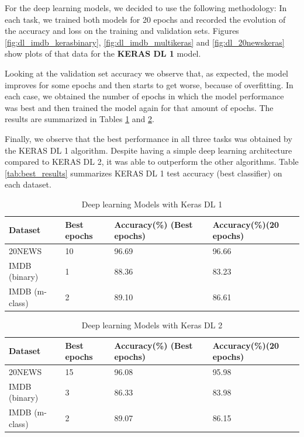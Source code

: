 \documentclass[conference]{IEEEtran}
\begin{document}
For the deep learning models, we decided to use the following methodology: In each task, we trained both models for 20 epochs and recorded the evolution of the accuracy and loss on the training and validation sets. Figures \ref{fig:dl_imdb_kerasbinary}, \ref{fig:dl_imdb_multikeras} and \ref{fig:dl_20newskeras} show plots of that data for the \textbf{KERAS DL 1} model.

Looking at the validation set accuracy we observe that, as expected, the model improves for some epochs and then starts to get worse, because of overfitting. In each case, we obtained the number of epochs in which the model performance was best and then trained the model again for that amount of epochs. The results are summarized in Tables \ref{tab:deeplearningDL1} and \ref{tab:deeplearningDL2}.

Finally, we observe that the best performance in all three tasks was obtained by the KERAS DL 1 algorithm. Despite having a simple deep learning architecture compared to KERAS DL 2, it was able to outperform the other algorithms. Table \ref{tab:best_results} summarizes KERAS DL 1 test accuracy (best classifier) on each dataset.

\begin{table}[H]
  \caption{Deep learning Models with Keras DL 1}
  \label{tab:deeplearningDL1}
  \begin{tabular}{|p{2cm}|p{1cm}|p{2cm}|p{2cm}|}

\hline
 Dataset& Best epochs &
 Accuracy(\%) (Best epochs) & Accuracy(\%)(20 epochs) \\
 \hline
  20NEWS             & 10                    & 96.69                          & 96.66               
 \\
 \hline 
IMDB (binary)      & 1                     & 88.36                          & 83.23                        
\\
\hline 
IMDB (m-class) & 2                     & 89.10                          & 86.61   \\

\hline
    
  \end{tabular}
\end{table}

\begin{table}[H]
  \caption{Deep learning Models with Keras DL 2}
  \label{tab:deeplearningDL2}
  \begin{tabular}{|p{2cm}|p{1cm}|p{2cm}|p{2cm}|}

\hline
 Dataset& Best epochs &
 Accuracy(\%) (Best epochs) & Accuracy(\%)(20 epochs) \\
 \hline
  20NEWS             & 15                    & 96.08                           & 95.98               
 \\
 \hline 
IMDB (binary)      & 3                     & 86.33                          & 83.98                        
\\
\hline 
IMDB (m-class) & 2                     &  89.07                        & 86.15    \\

\hline
    
  \end{tabular}
\end{table}
\end{document}
